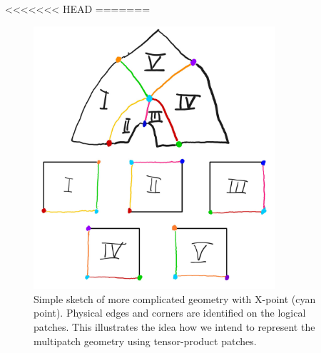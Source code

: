 \documentclass[presentation.tex]{subfiles}
\begin{document}
<<<<<<< HEAD
=======
\begin{figure}
	\centering
	\includegraphics*[width=0.8\textwidth]{images/5patches_sketch.jpg}
	\caption*{Simple sketch of more complicated geometry with X-point (cyan point). 
			  Physical edges and corners are identified on the logical patches.
			  This illustrates the idea how we intend to represent the multipatch geometry 
			  using tensor-product patches.}
\end{figure}
\end{document}

